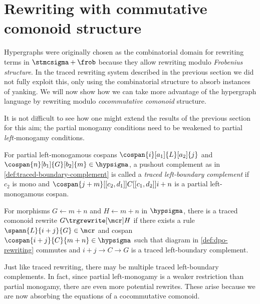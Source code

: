 \section{Rewriting with commutative comonoid structure}

Hypergraphs were originally chosen as the combinatorial domain for rewriting
terms in \(\stmcsigma + \frob\) because they allow rewriting modulo
\emph{Frobenius structure}.
In the traced rewriting system described in the previous section we did not
fully exploit this, only using the combinatorial structure to absorb instances
of yanking.
We will now show how we can take more advantage of the hypergraph language by
rewriting  modulo \emph{cocommutative comonoid} structure.

It is not difficult to see how one might extend the results of the previous
section for this aim; the partial monogamy conditions need to be weakened to
partial \emph{left-}monogamy conditions.

\begin{definition}
    \label{def:traced-left-boundary-complement}
    For partial left-monogamous cospans \(
    \cospan{i}[a_1]{L}[a_2]{j}
    \) and \(
    \cospan{n}[b_1]{G}[b_2]{m} \in \hypsigma
    \), a pushout complement as in \cref{def:traced-boundary-complement}
    is called a \emph{traced left-boundary complement} if \(c_2\)
    is mono and \(
    \cospan{j + m}[[c_2,d_1]]{C}[[c_1,d_2]]{{i + n}}
    \) is a partial left-monogamous cospan.
\end{definition}

\begin{definition}
    For morphisms \(G \leftarrow m+n\) and \(H \leftarrow m+n\) in
    \(\hypsigma\), there is a traced comonoid rewrite \(G \trgrewrite[\mcr] H\)
    if there exists a rule \(
    \spann{L}{i + j}{G} \in \mcr
    \) and cospan \(
    \cospan{i + j}{C}{m + n} \in \hypsigma
    \) such that diagram in \cref{def:dpo-rewriting} commutes and
    \(i + j \to C \to G\) is a
    traced left-boundary complement.
\end{definition}

Just like traced rewriting, there may be multiple traced left-boundary
complements.
In fact, since partial left-monogamy is a weaker restriction than partial
monogamy, there are even more potential rewrites.
These arise because we are now absorbing the equations of a cocommutative
comonoid.

